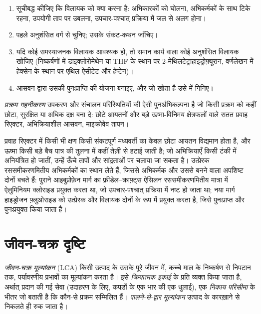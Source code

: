\begin{method}\label{met:b3:green-industrial:solvent-choice}
\begin{enumerate}
  \item सूचीबद्ध कीजिए कि विलायक को क्या करना है: अभिकारकों को घोलना, अभिकर्मकों के साथ टिके रहना,
        उपयोगी ताप पर उबलना, उपचार-पश्चात् प्रक्रिया में जल से अलग होना।
  \item पहले अनुशंसित वर्ग से चुनिए; उसके संकट-कथन जाँचिए।
  \item यदि कोई समस्याजनक विलायक आवश्यक हो, तो समान कार्य वाला कोई अनुशंसित विलायक
        खोजिए (निष्कर्षणों में डाइक्लोरोमेथेन या THF के स्थान पर
        2-मेथिलटेट्राहाइड्रोफ़्यूरान, वर्णलेखन में हेक्सेन के स्थान पर एथिल ऐसीटेट और हेप्टेन)।
  \item आसवन द्वारा उसकी पुनःप्राप्ति की योजना बनाइए, और जो खोता है उसे  में गिनिए।
\end{enumerate}
\end{method}

\begin{definition}\label{def:b3:green-industrial:intensification}
\emph{प्रक्रम गहनीकरण} उपकरण और संचालन
परिस्थितियों की ऐसी पुनर्अभिकल्पना है जो किसी प्रक्रम को कहीं छोटा,
सुरक्षित या अधिक दक्ष बना दे: छोटे आयतनों और
बड़े ऊष्मा-विनिमय क्षेत्रफलों वाले सतत प्रवाह रिएक्टर, अभिक्रियाशील आसवन, माइक्रोवेव तापन।
\end{definition}

प्रवाह रिएक्टर में किसी भी क्षण किसी संकटपूर्ण मध्यवर्ती का केवल छोटा आयतन
विद्यमान होता है, और ऊष्मा किसी बड़े बैच पात्र की तुलना में कहीं तेज़ी से हटाई जाती है; जो अभिक्रियाएँ
किसी टंकी में अनियंत्रित हो जातीं, उन्हें ऊँचे तापों और
सांद्रताओं पर चलाया जा सकता है। उत्प्रेरक रससमीकरणमितीय अभिकर्मकों का स्थान लेते हैं, जिससे
अभिकर्मक और उससे बनने वाला अपशिष्ट दोनों बचते हैं: पुराने
आइबुप्रोफ़ेन मार्ग का फ़्रीडेल--क्राफ़्ट्स ऐसिलन रससमीकरणमितीय मात्रा में ऐलुमिनियम क्लोराइड प्रयुक्त करता था, जो
उपचार-पश्चात् प्रक्रिया में नष्ट हो जाता था; नया मार्ग हाइड्रोजन फ़्लुओराइड को उत्प्रेरक और विलायक दोनों के रूप में प्रयुक्त करता है,
जिसे पुनःप्राप्त और पुनःप्रयुक्त किया जाता है।

\section{जीवन-चक्र दृष्टि}

\begin{definition}[जीवन-चक्र मूल्यांकन]\label{def:b3:green-industrial:lca}
\emph{जीवन-चक्र मूल्यांकन} (LCA) किसी उत्पाद के
उसके पूरे जीवन में, कच्चे माल के निष्कर्षण से निपटान तक, पर्यावरणीय प्रभावों का मूल्यांकन
करता है। इसे \emph{क्रियात्मक इकाई} के प्रति व्यक्त किया जाता है,
अर्थात् प्रदान की गई सेवा (उदाहरण के लिए, कपड़ों के एक भार की एक धुलाई), एक
\emph{निकाय परिसीमा} के भीतर जो बताती है कि कौन-से प्रक्रम
सम्मिलित हैं। \emph{पालने-से-द्वार मूल्यांकन}
उत्पाद के कारख़ाने से निकलते ही रुक जाता है।
\end{definition}

